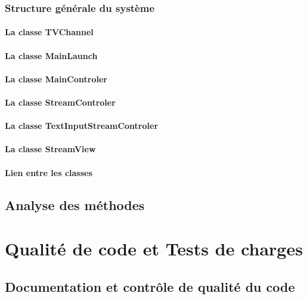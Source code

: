 \documentclass{polytech/polytech}
\begin{document}
\section{Structure générale du système}


\subsection{La classe TVChannel}

\subsection{La classe MainLaunch}

\subsection{La classe MainControler}

\subsection{La classe StreamControler}

\subsection{La classe TextInputStreamControler}

\subsection{La classe StreamView}


\subsection{Lien entre les classes}


\chapter{Analyse des méthodes}



\part{Qualité de code et Tests de charges}


\chapter{Documentation et contrôle de qualité du code}
\end{document}

